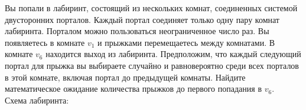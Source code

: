\documentclass{article}
\begin{document}
Вы попали в лабиринт, состоящий из нескольких комнат, соединенных системой двусторонних порталов. Каждый портал соединяет только одну пару комнат лабиринта. Порталом можно пользоваться неограниченное число раз. Вы появляетесь в комнате $v_1$ и прыжками перемещаетесь между комнатами. В комнате $v_6$ находится выход из лабиринта. Предположим, что каждый следующий портал для прыжка вы выбираете случайно и равновероятно среди всех порталов в этой комнате, включая портал до предыдущей комнаты. Найдите математическое ожидание количества прыжков до первого попадания в $v_6$.\\
Схема лабиринта:
\begin{figure}[h]
\end{figure}
\end{document}
